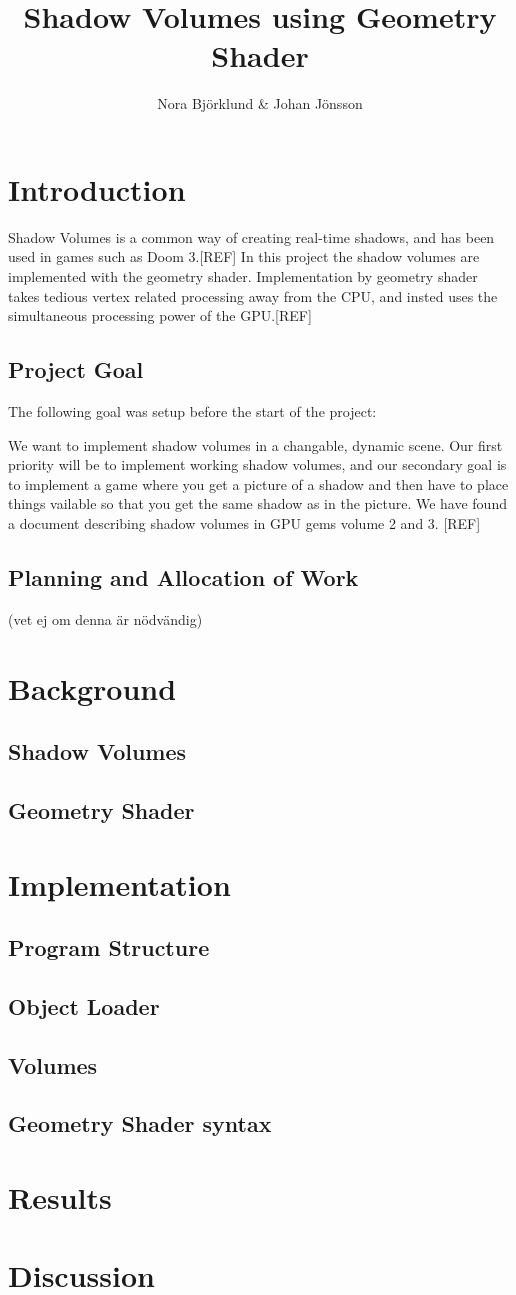 \documentclass[a4paper, 12pt]{article}
\title{Shadow Volumes using Geometry Shader}
\author{Nora Björklund \& Johan Jönsson}
\begin{document}
\maketitle
\section{Introduction}
Shadow Volumes is a common way of creating real-time shadows, and has been used in games such as Doom 3.[REF] In this project the shadow volumes are implemented with the geometry shader. Implementation by geometry shader takes tedious vertex related processing away from the CPU, and insted uses the simultaneous processing power of the GPU.[REF]
\subsection{Project Goal}
The following goal was setup before the start of the project:
\begin{displayquote}
We want to implement shadow volumes in a changable, dynamic scene. Our first priority will be to implement working shadow volumes, and our secondary goal is to implement a game where you get a picture of a shadow and then have to place things vailable so that you get the same shadow as in the picture. We have found a document describing shadow volumes in GPU gems volume 2 and 3. [REF]
\end{displayquote}
\subsection{Planning and Allocation of Work}
(vet ej om denna är nödvändig)
\section{Background}
\subsection{Shadow Volumes}
\subsection{Geometry Shader}
\section{Implementation}
\subsection{Program Structure}
\subsection{Object Loader}
\subsection{Volumes}
\subsection{Geometry Shader syntax}
\section{Results}
\section{Discussion }
\end{document}
